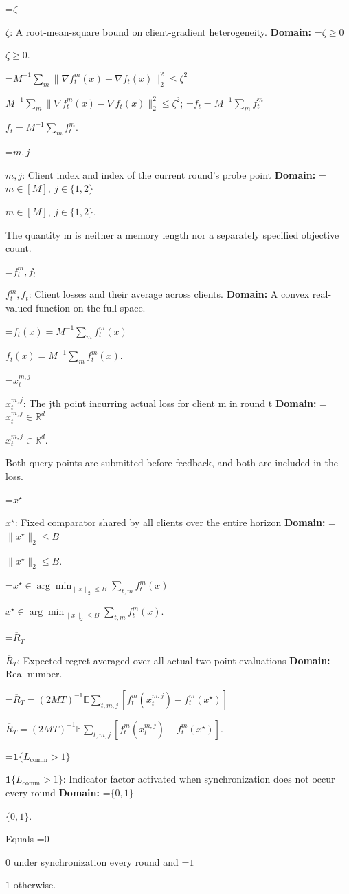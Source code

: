 \documentclass[10pt,a4paper]{article}
\newcommand{\AtlasMath}[1]{\par\begingroup\centering\setbox0=\hbox{$\displaystyle #1$}\ifdim\wd0>1.4\linewidth\typeout{ATLAS WIDE FORMULA: \the\wd0}\fi\ifdim\wd0>\linewidth\resizebox{\linewidth}{!}{\box0}\else\box0\fi\par\endgroup}
\newcommand{\AtlasInlineMath}[1]{\begingroup\setbox0=\hbox{$#1$}\ifdim\wd0>.4\linewidth\endgroup\AtlasMath{#1}\else\endgroup$#1$\fi}
\begin{document}
\AtlasInlineMath{\zeta}: A root-mean-square bound on client-gradient heterogeneity. \textbf{Domain:} \AtlasInlineMath{\zeta\ge0}.



\AtlasInlineMath{M^{-1}\sum_m\|\nabla f_t^m(x)-\nabla f_t(x)\|_2^2\le\zeta^2}; \AtlasInlineMath{f_t=M^{-1}\sum_mf_t^m}.



\AtlasInlineMath{m,j}: Client index and index of the current round's probe point \textbf{Domain:} \AtlasInlineMath{m\in[M],\ j\in\{1,2\}}.



The quantity m is neither a memory length nor a separately specified objective count.



\AtlasInlineMath{f_t^m,f_t}: Client losses and their average across clients. \textbf{Domain:} A convex real-valued function on the full space.



\AtlasInlineMath{f_t(x)=M^{-1}\sum_m f_t^m(x)}.



\AtlasInlineMath{x_t^{m,j}}: The jth point incurring actual loss for client m in round t \textbf{Domain:} \AtlasInlineMath{x_t^{m,j}\in\mathbb R^d}.



Both query points are submitted before feedback, and both are included in the loss.



\AtlasInlineMath{x^\star}: Fixed comparator shared by all clients over the entire horizon \textbf{Domain:} \AtlasInlineMath{\|x^\star\|_2\le B}.



\AtlasInlineMath{x^\star\in\arg\min_{\|x\|_2\le B}\sum_{t,m}f_t^m(x)}.



\AtlasInlineMath{\overline R_T}: Expected regret averaged over all actual two-point evaluations \textbf{Domain:} Real number.



\AtlasInlineMath{\overline R_T=(2MT)^{-1}\mathbb E\sum_{t,m,j}[f_t^m(x_t^{m,j})-f_t^m(x^\star)]}.



\AtlasInlineMath{\mathbf1\{L_{\mathrm{comm}}>1\}}: Indicator factor activated when synchronization does not occur every round \textbf{Domain:} \AtlasInlineMath{\{0,1\}}.



Equals \AtlasInlineMath{0} under synchronization every round and \AtlasInlineMath{1} otherwise.
\end{document}

